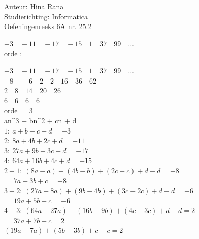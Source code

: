 \documentclass[a4paper]{article}
\begin{document}
\noindent \large Auteur: Hina Rana \\
\noindent \large Studierichting: Informatica\\
\noindent \large Oefeningenreeks 6A nr. 25.2 \\

\medskip

\normalsize

$ -3 \quad -11 \quad -17 \quad  -15 \quad 1  \quad 37 \quad 99 \quad ... $ \\

orde : 

$ -3\quad -11 \quad -17 \quad -15 \quad 1  \quad 37 \quad 99 \quad ... $ \\


$ -8\quad -6 \quad 2 \quad 2 \quad 16  \quad 36 \quad 62  $ \\


$ 2 \quad 8 \quad 14 \quad 20 \quad 26  $ \\

$ 6 \quad 6 \quad  6 \quad 6  $ \\

orde $ = 3$\\

 an^3 + bn^2 + cn + d \\

$ 1: \ a + b + c + d = -3 $ \\

$ 2: \ 8a + 4b + 2c + d = -11 $ \\

$ 3: \ 27a + 9b + 3c + d = -17 $ \\

$ 4: \ 64a + 16b + 4c + d = -15 $ \\

$ 2 - 1: \ (8a - a) + (4b - b) + (2c - c) + d - d = -8 $ \\

$ = 7a + 3b + c = -8 $ \\

$ 3 - 2: \ (27a - 8a) + (9b - 4b) + (3c - 2c) + d - d = -6 $ \\

$ = 19a + 5b + c = -6 $ \\

$ 4 - 3: \ (64a - 27a) + (16b - 9b) + (4c - 3c) + d - d = 2 $ \\

$ = 37a + 7b + c = 2 $ \\

$ (19a - 7a) + (5b - 3b) + c - c = 2 $ \\
\end{document}
